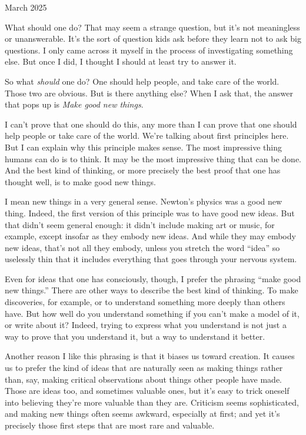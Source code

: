 March 2025

What should one do? That may seem a strange question, but it's not
meaningless or unanswerable. It's the sort of question kids ask before
they learn not to ask big questions. I only came across it myself in the
process of investigating something else. But once I did, I thought I
should at least try to answer it.

So what \emph{should} one do? One should help people, and take care of
the world. Those two are obvious. But is there anything else? When I ask
that, the answer that pops up is \emph{Make good new things}.

I can't prove that one should do this, any more than I can prove that
one should help people or take care of the world. We're talking about
first principles here. But I can explain why this principle makes sense.
The most impressive thing humans can do is to think. It may be the most
impressive thing that can be done. And the best kind of thinking, or
more precisely the best proof that one has thought well, is to make good
new things.

I mean new things in a very general sense. Newton's physics was a good
new thing. Indeed, the first version of this principle was to have good
new ideas. But that didn't seem general enough: it didn't include making
art or music, for example, except insofar as they embody new ideas. And
while they may embody new ideas, that's not all they embody, unless you
stretch the word ``idea'' so uselessly thin that it includes everything
that goes through your nervous system.

Even for ideas that one has consciously, though, I prefer the phrasing
``make good new things.'' There are other ways to describe the best kind
of thinking. To make discoveries, for example, or to understand
something more deeply than others have. But how well do you understand
something if you can't make a model of it, or write about it? Indeed,
trying to express what you understand is not just a way to prove that
you understand it, but a way to understand it better.

Another reason I like this phrasing is that it biases us toward
creation. It causes us to prefer the kind of ideas that are naturally
seen as making things rather than, say, making critical observations
about things other people have made. Those are ideas too, and sometimes
valuable ones, but it's easy to trick oneself into believing they're
more valuable than they are. Criticism seems sophisticated, and making
new things often seems awkward, especially at first; and yet it's
precisely those first steps that are most rare and valuable.

